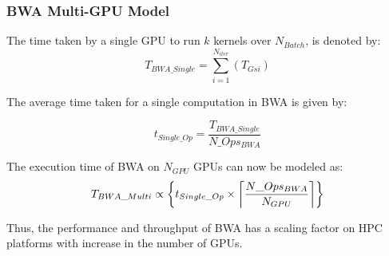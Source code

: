 \documentclass[conference]{IEEEtran}
\begin{document}
\subsubsection{BWA Multi-GPU Model}

\par
The time taken by a single GPU to run $k$ kernels over $N_{Batch}$, is denoted by: 
{\scriptsize
\begin{equation}
T_{BWA\_Single} = \sum_{i=1}^{N_{iter}}(T_{Gsi})
\end{equation}
}%


\par

The average time taken for a single computation in BWA is given by:

{\scriptsize
\begin{equation}
t_{Single\_Op} = \frac{T_{BWA\_Single}}{N\_Ops_{BWA}}
\end{equation}
}%

The execution time of BWA on $N_{GPU}$ GPUs can now be modeled as:
\DeclarePairedDelimiter{\ceil}{\lceil}{\rceil}
{\scriptsize
\begin{equation}\label{e26}
T_{BWA\_Multi} \propto \bigg\{t_{Single\_Op} \times \ceil*{\frac{N\_Ops_{BWA}}{N_{GPU}}}\bigg\} 
\end{equation}
}%

% 
% 

Thus, the performance and throughput of BWA has a scaling factor on HPC platforms with increase in the number of GPUs. 
\end{document}
